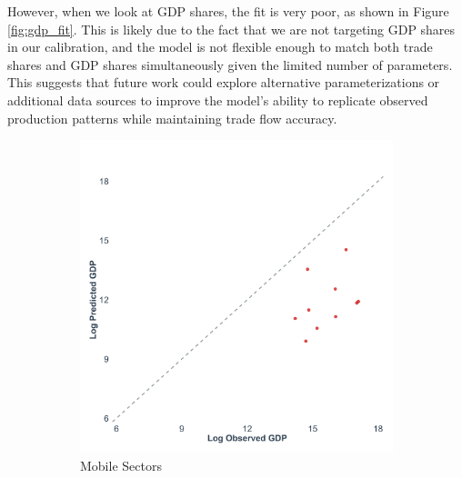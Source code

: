 However, when we look at GDP shares, the fit is very poor, as shown in Figure \ref{fig:gdp_fit}. This is likely due to the fact that we are not targeting GDP shares in our calibration, and the model is not flexible enough to match both trade shares and GDP shares simultaneously given the limited number of parameters. This suggests that future work could explore alternative parameterizations or additional data sources to improve the model's ability to replicate observed production patterns while maintaining trade flow accuracy.

\begin{figure}[H]
    \centering
    \begin{subfigure}{0.48\textwidth}
        \centering
        \includegraphics[width=\textwidth]{code/figures/gdp_fit_mobile.png}
        \caption{Mobile Sectors}
        \label{fig:gdp_fit_mobile}
    \end{subfigure}
    \hfill
    \begin{subfigure}{0.48\textwidth}
        \centering

\end{subfigure}
\end{figure}
